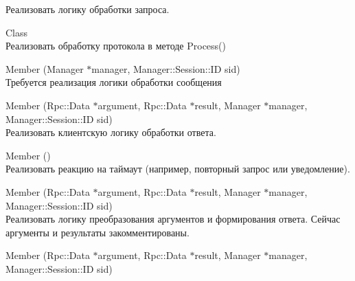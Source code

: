 \begin{DoxyRefList}
\label{todo__todo000012}%
%
Реализовать логику обработки запроса.  
\item[Class \doxylink{class_g_n_e_t_1_1_discount_announce}{GNET\+::Discount\+Announce} ]\hfill \\
\label{todo__todo000013}%
%
Реализовать обработку протокола в методе Process()  
\item[Member \doxylink{class_g_n_e_t_1_1_game2_a_u_a778ef1862d9abe838530c75c45882fb7}{GNET\+::Game2\+AU\+::Process} (Manager \texorpdfstring{$\ast$}{*}manager, Manager\+::\+Session\+::\+ID sid)]\hfill \\
\label{todo__todo000014}%
%
Требуется реализация логики обработки сообщения  
\item[Member \doxylink{class_g_n_e_t_1_1_get_user_coupon_a6425acba2965486d055a994213699122}{GNET\+::Get\+User\+Coupon\+::Client} (Rpc\+::\+Data \texorpdfstring{$\ast$}{*}argument, Rpc\+::\+Data \texorpdfstring{$\ast$}{*}result, Manager \texorpdfstring{$\ast$}{*}manager, Manager\+::\+Session\+::\+ID sid)]\hfill \\
\label{todo__todo000017}%
%
Реализовать клиентскую логику обработки ответа.  
\item[Member \doxylink{class_g_n_e_t_1_1_get_user_coupon_aaf7a0b7d88805c3071a892a7eb45e7d6}{GNET\+::Get\+User\+Coupon\+::On\+Timeout} ()]\hfill \\
\label{todo__todo000018}%
%
Реализовать реакцию на таймаут (например, повторный запрос или уведомление).  
\item[Member \doxylink{class_g_n_e_t_1_1_get_user_coupon_a6fe67ac1c3e044ed8f94f8299894ed4b}{GNET\+::Get\+User\+Coupon\+::Server} (Rpc\+::\+Data \texorpdfstring{$\ast$}{*}argument, Rpc\+::\+Data \texorpdfstring{$\ast$}{*}result, Manager \texorpdfstring{$\ast$}{*}manager, Manager\+::\+Session\+::\+ID sid)]\hfill \\
\label{todo__todo000016}%
%
Реализовать логику преобразования аргументов и формирования ответа. Сейчас аргументы и результаты закомментированы.  
\item[Member \doxylink{class_g_n_e_t_1_1_g_query_passwd_a15c95c81230be5795439a7d9df0fe395}{GNET\+::GQuery\+Passwd\+::Client} (Rpc\+::\+Data \texorpdfstring{$\ast$}{*}argument, Rpc\+::\+Data \texorpdfstring{$\ast$}{*}result, Manager \texorpdfstring{$\ast$}{*}manager, Manager\+::\+Session\+::\+ID sid)]\hfill \\

\end{DoxyRefList}
